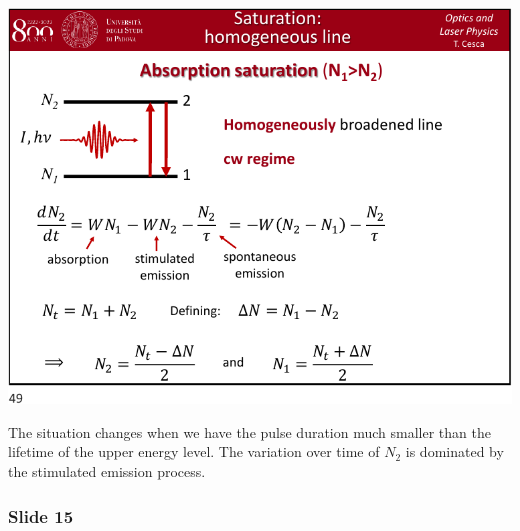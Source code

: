 \documentclass[../main/main.tex]{subfiles}
\begin{document}
\begin{minipage}[]{0.5\linewidth}
\centering
\includegraphics[page=14,width=1\textwidth]{../lessons/pdf_file/10_lecture.pdf}
\end{minipage}
\hspace{0.3cm}\vspace{0.3cm}
\begin{minipage}[c]{0.47\linewidth}

The situation changes when we have the pulse duration much smaller than the lifetime of the upper energy level. The variation over time of \( N_2 \) is dominated by the stimulated emission process.

\end{minipage}

\subsubsection*{Slide 15}
\end{document}
